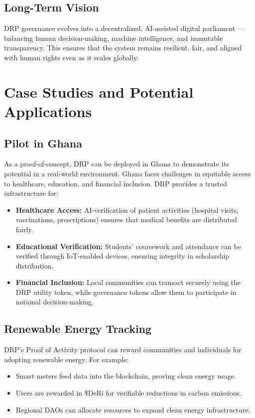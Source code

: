 \documentclass[11pt,a4paper]{article}
\begin{document}
\subsection{Long-Term Vision}
DRP governance evolves into a decentralized, AI-assisted digital parliament — balancing human decision-making, machine intelligence, and immutable transparency. This ensures that the system remains resilient, fair, and aligned with human rights even as it scales globally.

\section{Case Studies and Potential Applications}

\subsection{Pilot in Ghana}
As a proof-of-concept, DRP can be deployed in Ghana to demonstrate its potential in a real-world environment. Ghana faces challenges in equitable access to healthcare, education, and financial inclusion. DRP provides a trusted infrastructure for:
\begin{itemize}
    \item \textbf{Healthcare Access:} AI-verification of patient activities (hospital visits, vaccinations, prescriptions) ensures that medical benefits are distributed fairly.
    \item \textbf{Educational Verification:} Students’ coursework and attendance can be verified through IoT-enabled devices, ensuring integrity in scholarship distribution.
    \item \textbf{Financial Inclusion:} Local communities can transact securely using the DRP utility token, while governance tokens allow them to participate in national decision-making.
\end{itemize}

\subsection{Renewable Energy Tracking}
DRP’s Proof of Activity protocol can reward communities and individuals for adopting renewable energy. For example:
\begin{itemize}
    \item Smart meters feed data into the blockchain, proving clean energy usage.
    \item Users are rewarded in \$DeRi for verifiable reductions in carbon emissions.
    \item Regional DAOs can allocate resources to expand clean energy infrastructure.
\end{itemize}
\end{document}
